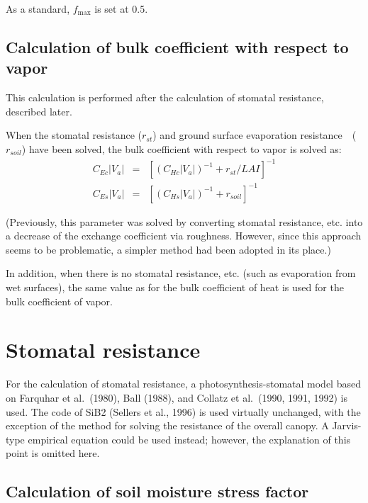 As a standard, \(f_{\max}\) is set at 0.5.

\hypertarget{calculation-of-bulk-coefficient-with-respect-to-vapor}{%
\subsection{Calculation of bulk coefficient with respect to vapor}\label{calculation-of-bulk-coefficient-with-respect-to-vapor}}

This calculation is performed after the calculation of stomatal resistance, described later.

When the stomatal resistance (\(r_{st}\)) and ground surface evaporation resistance　(\(r_{soil}\)) have been solved, the bulk coefficient with respect to vapor is solved as: \begin{eqnarray}
 C_{Ec} |V_a| &=& \left[ (C_{Hc} |V_a|)^{-1} + r_{st} / LAI\right]^{-1} \\
 C_{Es} |V_a| &=& \left[ (C_{Hs} |V_a|)^{-1} + r_{soil}\right]^{-1}
\end{eqnarray}

(Previously, this parameter was solved by converting stomatal resistance, etc. into a decrease of the exchange coefficient via roughness. However, since this approach seems to be problematic, a
simpler method had been adopted in its place.)

In addition, when there is no stomatal resistance, etc. (such as evaporation from wet surfaces), the same value as for the bulk coefficient of heat is used for the bulk coefficient of vapor.

\hypertarget{stomatal-resistance}{%
\section{Stomatal resistance}\label{stomatal-resistance}}

For the calculation of stomatal resistance, a photosynthesis-stomatal model based on Farquhar et al.~(1980), Ball (1988), and Collatz et al.~(1990, 1991, 1992) is used. The code of SiB2 (Sellers et
al., 1996) is used virtually unchanged, with the exception of the method for solving the resistance of the overall canopy. A Jarvis-type empirical equation could be used instead; however, the
explanation of this point is omitted here.

\hypertarget{calculation-of-soil-moisture-stress-factor}{%
\subsection{Calculation of soil moisture stress factor}\label{calculation-of-soil-moisture-stress-factor}}

